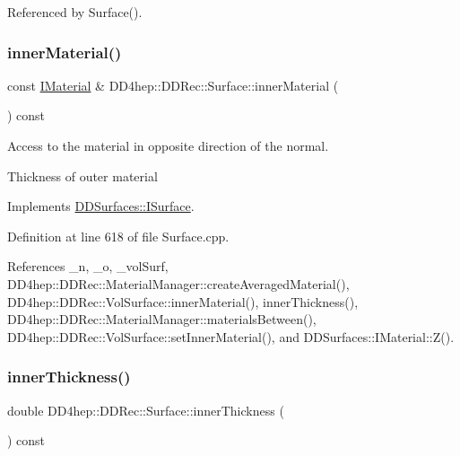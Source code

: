 Referenced by Surface().

\hypertarget{class_d_d4hep_1_1_d_d_rec_1_1_surface_a8e0b69cde006a054df7c33d8a781093b}{}\label{class_d_d4hep_1_1_d_d_rec_1_1_surface_a8e0b69cde006a054df7c33d8a781093b} 
\subsubsection{\texorpdfstring{inner\+Material()}{innerMaterial()}}
{\footnotesize\ttfamily const \hyperlink{class_d_d_surfaces_1_1_i_material}{I\+Material} \& D\+D4hep\+::\+D\+D\+Rec\+::\+Surface\+::inner\+Material (\begin{DoxyParamCaption}{ }\end{DoxyParamCaption}) const\hspace{0.3cm}{\ttfamily [virtual]}}



Access to the material in opposite direction of the normal. 

Thickness of outer material 

Implements \hyperlink{class_d_d_surfaces_1_1_i_surface_a18942d2f0ea7478506765a50fa44d5e3}{D\+D\+Surfaces\+::\+I\+Surface}.



Definition at line 618 of file Surface.\+cpp.



References \+\_\+n, \+\_\+o, \+\_\+vol\+Surf, D\+D4hep\+::\+D\+D\+Rec\+::\+Material\+Manager\+::create\+Averaged\+Material(), D\+D4hep\+::\+D\+D\+Rec\+::\+Vol\+Surface\+::inner\+Material(), inner\+Thickness(), D\+D4hep\+::\+D\+D\+Rec\+::\+Material\+Manager\+::materials\+Between(), D\+D4hep\+::\+D\+D\+Rec\+::\+Vol\+Surface\+::set\+Inner\+Material(), and D\+D\+Surfaces\+::\+I\+Material\+::\+Z().

\hypertarget{class_d_d4hep_1_1_d_d_rec_1_1_surface_a784001d72c1c77429fab90220c2af7e8}{}\label{class_d_d4hep_1_1_d_d_rec_1_1_surface_a784001d72c1c77429fab90220c2af7e8} 
\subsubsection{\texorpdfstring{inner\+Thickness()}{innerThickness()}}
{\footnotesize\ttfamily double D\+D4hep\+::\+D\+D\+Rec\+::\+Surface\+::inner\+Thickness (\begin{DoxyParamCaption}{ }\end{DoxyParamCaption}) const\hspace{0.3cm}{\ttfamily [virtual]}}


